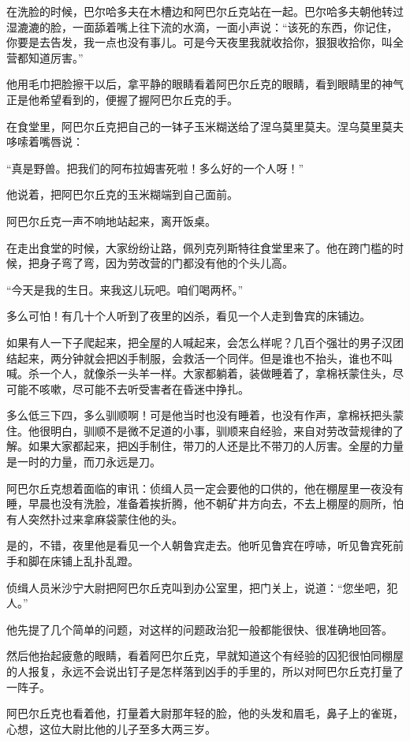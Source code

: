 在洗脸的时候，巴尔哈多夫在木槽边和阿巴尔丘克站在一起。巴尔哈多夫朝他转过湿漉漉的脸，一面舔着嘴上往下流的水滴，一面小声说：“该死的东西，你记住，你要是去告发，我一点也没有事儿。可是今天夜里我就收拾你，狠狠收拾你，叫全营都知道厉害。”

他用毛巾把脸擦干以后，拿平静的眼睛看着阿巴尔丘克的眼睛，看到眼睛里的神气正是他希望看到的，便握了握阿巴尔丘克的手。

在食堂里，阿巴尔丘克把自己的一钵子玉米糊送给了涅乌莫里莫夫。涅乌莫里莫夫哆嗦着嘴唇说：

“真是野兽。把我们的阿布拉姆害死啦！多么好的一个人呀！”

他说着，把阿巴尔丘克的玉米糊端到自己面前。

阿巴尔丘克一声不响地站起来，离开饭桌。

在走出食堂的时候，大家纷纷让路，佩列克列斯特往食堂里来了。他在跨门槛的时候，把身子弯了弯，因为劳改营的门都没有他的个头儿高。

“今天是我的生日。来我这儿玩吧。咱们喝两杯。”

多么可怕！有几十个人听到了夜里的凶杀，看见一个人走到鲁宾的床铺边。

如果有人一下子爬起来，把全屋的人喊起来，会怎么样呢？几百个强壮的男子汉团结起来，两分钟就会把凶手制服，会救活一个同伴。但是谁也不抬头，谁也不叫喊。杀一个人，就像杀一头羊一样。大家都躺着，装做睡着了，拿棉袄蒙住头，尽可能不咳嗽，尽可能不去听受害者在昏迷中挣扎。

多么低三下四，多么驯顺啊！可是他当时也没有睡着，也没有作声，拿棉袄把头蒙住。他很明白，驯顺不是微不足道的小事，驯顺来自经验，来自对劳改营规律的了解。如果大家都起来，把凶手制住，带刀的人还是比不带刀的人厉害。全屋的力量是一时的力量，而刀永远是刀。

阿巴尔丘克想着面临的审讯：侦缉人员一定会要他的口供的，他在棚屋里一夜没有睡，早晨也没有洗脸，准备着挨折腾，他不朝矿井方向去，不去上棚屋的厕所，怕有人突然扑过来拿麻袋蒙住他的头。

是的，不错，夜里他是看见一个人朝鲁宾走去。他听见鲁宾在哼哧，听见鲁宾死前手和脚在床铺上乱扑乱蹬。

侦缉人员米沙宁大尉把阿巴尔丘克叫到办公室里，把门关上，说道：“您坐吧，犯人。”

他先提了几个简单的问题，对这样的问题政治犯一般都能很快、很准确地回答。

然后他抬起疲惫的眼睛，看着阿巴尔丘克，早就知道这个有经验的囚犯很怕同棚屋的人报复，永远不会说出钉子是怎样落到凶手的手里的，所以对阿巴尔丘克打量了一阵子。

阿巴尔丘克也看着他，打量着大尉那年轻的脸，他的头发和眉毛，鼻子上的雀斑，心想，这位大尉比他的儿子至多大两三岁。

